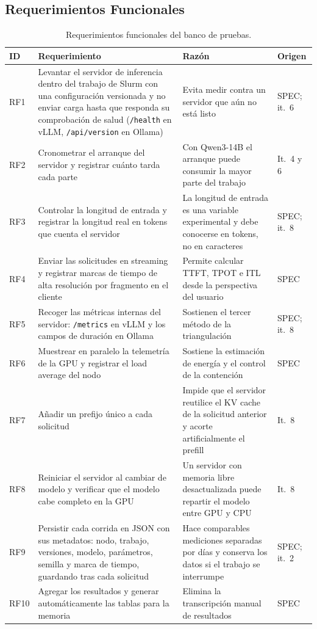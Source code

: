 \subsection{Requerimientos Funcionales}
\label{sec:cap2:rf}

\begin{table}[htbp]
  \centering
  \caption{Requerimientos funcionales del banco de pruebas.}
  \label{tab:cap2:rf}
  \footnotesize
  \begin{tabular}{|p{}|p{}|p{}|p{}|}
    \hline
    \textbf{ID} & \textbf{Requerimiento} & \textbf{Razón} & \textbf{Origen} \\
    \hline
    RF1 & Levantar el servidor de inferencia dentro del trabajo de Slurm con una configuración versionada y no enviar carga hasta que responda su comprobación de salud (\texttt{/health} en vLLM, \texttt{/api/version} en Ollama) & Evita medir contra un servidor que aún no está listo & SPEC; it.~6 \\
    \hline
    RF2 & Cronometrar el arranque del servidor y registrar cuánto tarda cada parte & Con Qwen3-14B el arranque puede consumir la mayor parte del trabajo & It.~4 y 6 \\
    \hline
    RF3 & Controlar la longitud de entrada y registrar la longitud real en tokens que cuenta el servidor & La longitud de entrada es una variable experimental y debe conocerse en tokens, no en caracteres & SPEC; it.~8 \\
    \hline
    RF4 & Enviar las solicitudes en streaming y registrar marcas de tiempo de alta resolución por fragmento en el cliente & Permite calcular TTFT, TPOT e ITL desde la perspectiva del usuario & SPEC \\
    \hline
    RF5 & Recoger las métricas internas del servidor: \texttt{/metrics} en vLLM y los campos de duración en Ollama & Sostienen el tercer método de la triangulación & SPEC; it.~8 \\
    \hline
    RF6 & Muestrear en paralelo la telemetría de la GPU y registrar el load average del nodo & Sostiene la estimación de energía y el control de la contención & SPEC \\
    \hline
    RF7 & Añadir un prefijo único a cada solicitud & Impide que el servidor reutilice el KV cache de la solicitud anterior y acorte artificialmente el prefill & It.~8 \\
    \hline
    RF8 & Reiniciar el servidor al cambiar de modelo y verificar que el modelo cabe completo en la GPU & Un servidor con memoria libre desactualizada puede repartir el modelo entre GPU y CPU & It.~8 \\
    \hline
    RF9 & Persistir cada corrida en JSON con sus metadatos: nodo, trabajo, versiones, modelo, parámetros, semilla y marca de tiempo, guardando tras cada solicitud & Hace comparables mediciones separadas por días y conserva los datos si el trabajo se interrumpe & SPEC; it.~2 \\
    \hline
    RF10 & Agregar los resultados y generar automáticamente las tablas para la memoria & Elimina la transcripción manual de resultados & SPEC \\
    \hline
  \end{tabular}
\end{table}

